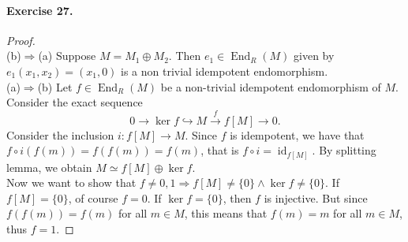 \documentclass[12pt,a4paper]{report}
\theoremstyle{definition}
\theoremstyle{num.custom-title}
\DeclareMathOperator{\id}{id}
\DeclareMathOperator{\End}{End}
\DeclareMathOperator{\imp}{\Rightarrow}
\begin{document}
\paragraph{Exercise 27.} 
\begin{proof}\ \\
(b)$\imp$(a) Suppose $M=M_1 \oplus M_2$. Then $e_1 \in \End_R(M)$ given by $e_1(x_1,x_2)=(x_1,0)$ is a non trivial idempotent endomorphism.\\
(a)$\imp$(b) Let $f \in \End_R(M)$ be a non-trivial idempotent endomorphism of $M$. Consider the exact sequence
\[
0 \to \ker f \hookrightarrow M \stackrel{f}{\to} f[M] \to 0.
\]
Consider the inclusion $i : f[M] \to M$. Since $f$ is idempotent, we have that $f \circ i (f(m)) = f(f(m)) = f(m)$, that is $f \circ i = \id_{f[M]}$. By splitting lemma, we obtain $M \simeq f[M] \oplus \ker f$.\\
Now we want to show that $f \neq 0,1 \imp f[M] \neq \{0\} \wedge \ker f \neq \{0\}$. If $f[M]=\{0\}$, of course $f=0$. If $\ker f = \{0\}$, then $f$ is injective. But since $f(f(m))=f(m)$ for all $m \in M$, this means that $f(m)=m$ for all $m \in M$, thus $f=1$.
\end{proof}
\end{document}
